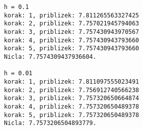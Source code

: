 \documentclass[a4paper,oneside,12pt]{article}
\theoremstyle{definition}
\begin{document}
\begin{verbatim}
h = 0.1
korak: 1, priblizek: 7.811265563327425
korak: 2, priblizek: 7.757021945794063
korak: 3, priblizek: 7.757430943970567
korak: 4, priblizek: 7.757430943793660
korak: 5, priblizek: 7.757430943793660
Nicla: 7.7574309437936604.

h = 0.01
korak: 1, priblizek: 7.811097555023491
korak: 2, priblizek: 7.756912740566238
korak: 3, priblizek: 7.757320650664874
korak: 4, priblizek: 7.757320650489378
korak: 5, priblizek: 7.757320650489378
Nicla: 7.7573206504893779.
\end{verbatim}
\end{document}
